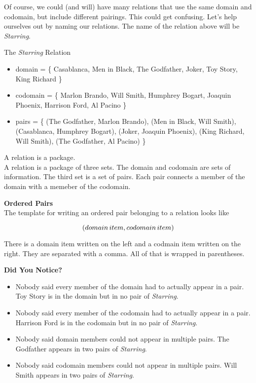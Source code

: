\documentclass{ximera}
\begin{document}
Of course, we could (and will) have many relations that use the same domain and codomain, but include different pairings. This could get confusing.  Let's help ourselves out by naming our relations.  The name of the relation above will be \textit{Starring}.


\begin{example} The \textit{Starring} Relation\\
\begin{itemize}
\item domain = \{ Casablanca, Men in Black,  The Godfather, Joker, Toy Story, King Richard \}  
\item codomain = \{ Marlon Brando, Will Smith, Humphrey Bogart, Joaquin Phoenix, Harrison Ford, Al Pacino  \} 
\item pairs = \{ (The Godfather, Marlon Brando), (Men in Black, Will Smith), (Casablanca, Humphrey Bogart), (Joker, Joaquin Phoenix), (King Richard, Will Smith), (The Godfather, Al Pacino) \} 
\end{itemize}
\end{example}


A relation is a package.  \\

A relation is a package of three sets. The domain and codomain are sets of information.  The third set is a set of pairs.  Each pair connects a member of the domain with a memeber of the codomain. 


\begin{template} \textbf{\textcolor{purple!85!blue}{Ordered Pairs}}  \\
The template for writing an ordered pair belonging to a relation looks like  

\[
\large{( domain \, item, codomain \, item )}
\]
\end{template}

There is a domain item written on the left and a codmain item written on the right.  They are separated with a comma.  All of that is wrapped in parentheses.


\begin{warning} \textbf{\textcolor{red!80!black}{Did You Notice?}}  \\
\begin{itemize}
\item Nobody said every member of the domain had to actually appear in a pair.  Toy Story is in the domain but in no pair of \textit{Starring}.
\item Nobody said every member of the codomain had to actually appear in a pair.  Harrison Ford is in the codomain but in no pair of \textit{Starring}.
\item Nobody said domain members could not appear in multiple pairs.  The Godfather appears in two pairs of \textit{Starring}.
\item Nobody said codomain members could not appear in multiple pairs.  Will Smith appears in two pairs of \textit{Starring}.
\end{itemize}
\end{warning}
\end{document}

